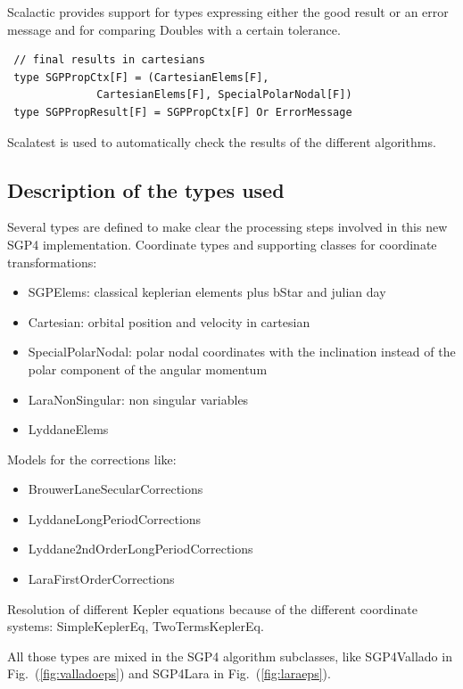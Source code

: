 \documentclass{article}
\begin{document}
Scalactic provides support for types expressing either the good result or an error message
and for comparing Doubles with a certain tolerance.
\begin{verbatim}
 // final results in cartesians
 type SGPPropCtx[F] = (CartesianElems[F],
              CartesianElems[F], SpecialPolarNodal[F])
 type SGPPropResult[F] = SGPPropCtx[F] Or ErrorMessage
\end{verbatim}

Scalatest is used to automatically check the results of the different algorithms.

\subsection{Description of the types used}
\label{sec:typesystem}

Several types are defined to make clear the processing steps involved in this new SGP4 implementation.
Coordinate types and supporting classes for coordinate transformations:
\begin{itemize}
\item SGPElems: classical keplerian elements plus bStar and julian day
\item Cartesian: orbital position and velocity in cartesian
\item SpecialPolarNodal: polar nodal coordinates with the inclination instead of the polar component of the angular momentum
\item LaraNonSingular: non singular variables
\item LyddaneElems
\end{itemize}

Models for the corrections like:
\begin{itemize}
\item BrouwerLaneSecularCorrections
\item LyddaneLongPeriodCorrections
\item Lyddane2ndOrderLongPeriodCorrections
\item LaraFirstOrderCorrections
\end{itemize}

Resolution of different Kepler equations because of the different coordinate systems: SimpleKeplerEq, TwoTermsKeplerEq.

All those types are mixed in the SGP4 algorithm subclasses, like SGP4Vallado in Fig.~(\ref{fig:valladoeps}) and SGP4Lara in Fig.~(\ref{fig:laraeps}).
\end{document}
